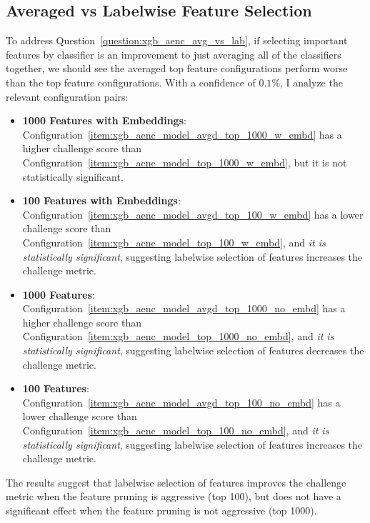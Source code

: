 \documentclass[\main/thesis.tex]{subfiles}
\begin{document}
\subsection{Averaged vs Labelwise Feature Selection}
To address Question~\ref{question:xgb_aenc_avg_vs_lab}, if selecting important features by classifier is an improvement to just averaging all of the classifiers together, we should see the averaged top feature configurations perform worse than the top feature configurations.
With a confidence of $0.1\%$, I analyze the relevant configuration pairs:
\begin{itemize}
    \item \textbf{1000 Features with Embeddings}: Configuration~\ref{item:xgb_aenc_model_avgd_top_1000_w_embd} has a higher challenge score than Configuration~\ref{item:xgb_aenc_model_top_1000_w_embd}, but it is not statistically significant.
    \item \textbf{100 Features with Embeddings}: Configuration~\ref{item:xgb_aenc_model_avgd_top_100_w_embd} has a lower challenge score than Configuration~\ref{item:xgb_aenc_model_top_100_w_embd}, and \emph{it is statistically significant}, suggesting labelwise selection of features increases the challenge metric.
    \item \textbf{1000 Features}: Configuration~\ref{item:xgb_aenc_model_avgd_top_1000_no_embd} has a higher challenge score than Configuration~\ref{item:xgb_aenc_model_top_1000_no_embd}, and \emph{it is statistically significant}, suggesting labelwise selection of features decreases the challenge metric.
    \item \textbf{100 Features}: Configuration~\ref{item:xgb_aenc_model_avgd_top_100_no_embd} has a lower challenge score than Configuration~\ref{item:xgb_aenc_model_top_100_no_embd}, and \emph{it is statistically significant}, suggesting labelwise selection of features increases the challenge metric.
\end{itemize}

The results suggest that labelwise selection of features improves the challenge metric when the feature pruning is aggressive (top 100), but does not have a significant effect when the feature pruning is not aggressive (top 1000).
\end{document}
